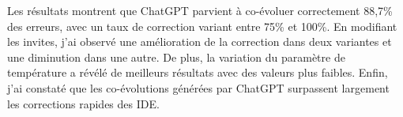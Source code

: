 Les résultats montrent que ChatGPT parvient à co-évoluer correctement 88,7\% des erreurs, avec un taux de correction variant entre 75\% et 100\%. En modifiant les invites, j'ai observé une amélioration de la correction dans deux variantes et une diminution dans une autre. De plus, la variation du paramètre de température a révélé de meilleurs résultats avec des valeurs plus faibles. Enfin, j'ai constaté que les co-évolutions générées par ChatGPT surpassent largement les corrections rapides des IDE.


